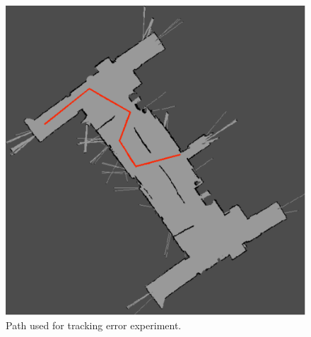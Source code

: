 \documentclass[conference]{IEEEtran}
\begin{document}
\begin{figure}
  \includegraphics[width=\columnwidth]{localisation-experiment-path}
  \caption{Path used for tracking error experiment.}
  \label{fig:locpath}
\end{figure}
\end{document}
